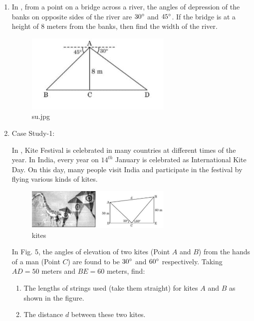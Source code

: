 \begin{enumerate}
    \hfill{}\item In , from a point on a bridge across a river, the angles of depression of the banks on opposite sides of the river are $30\degree$ and $45\degree$. If the bridge is at a height of $8$ meters from the banks, then find the width of the river.
    \begin{figure}[H]
        \centering
        \includegraphics[width=70mm]{cbse-math/figs/su.jpeg}
        \caption{su.jpg}
        \label{fig:su.jpeg}
    \end{figure}
    
    \hfill{}\item Case Study-1:
    
    In , Kite Festival is celebrated in many countries at different times of the year. In India, every year on $14^{th}$ January is celebrated as International Kite Day. On this day, many people visit India and participate in the festival by flying various kinds of kites.
    
    \begin{figure}[H]
	\centering
        \includegraphics[width=70mm]{cbse-math/figs/kite.jpeg}
        \caption{kites}
        \label{fig:kite.jpeg}
    \end{figure}
    
    In Fig. 5, the angles of elevation of two kites (Point $A$ and $B$) from the hands of a man (Point $C$) are found to be $30\degree$ and $60\degree$ respectively. Taking $AD = 50$ meters and $BE = 60$ meters, find:
    \begin{enumerate}
        \hfill{}\item The lengths of strings used (take them straight) for kites $A$ and $B$ as shown in the figure.
        \hfill{}\item The distance $d$ between these two kites.
    \end{enumerate}
    

\end{enumerate}

